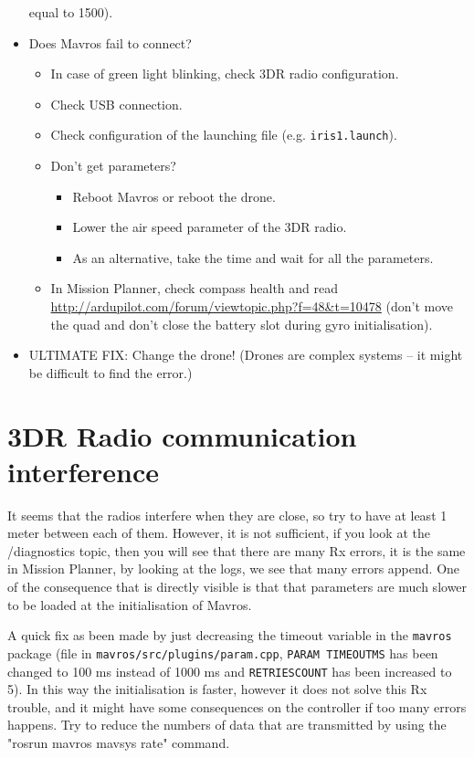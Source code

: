 \documentclass[titlepage,11pt,a4paper]{article}
\begin{document}
\begin{appendices}
\begin{itemize}
    equal to 1500).
  \item Does Mavros fail to connect?
    \begin{itemize}
      \item In case of green light blinking, check 3DR radio
        configuration.
      \item Check USB connection.
      \item Check configuration of the launching file (e.g. \texttt{iris1.launch}).
      \item Don't get parameters?
        \begin{itemize}
          \item Reboot Mavros or reboot the drone.
          \item Lower the air speed parameter of the 3DR radio.
          \item As an alternative, take the time and wait for all the
            parameters.
        \end{itemize}
      \item In Mission Planner, check compass health and read
        \url{http://ardupilot.com/forum/viewtopic.php?f=48&t=10478}
        (don't move the quad and don't close the battery slot during gyro
        initialisation).
    \end{itemize}
  \item ULTIMATE FIX: Change the drone! (Drones are complex systems -- it
    might be difficult to find the error.)
\end{itemize}
    
\section{3DR Radio communication interference}
It seems that the radios interfere when they are close, so try to have
at least 1 meter between each of them.  However, it is not sufficient,
if you look at the /diagnostics topic, then you will see that there
are many Rx errors, it is the same in Mission Planner, by looking at
the logs, we see that many errors append. One of the consequence that
is directly visible is that that parameters are much slower to be
loaded at the initialisation of Mavros.

A quick fix as been made by just decreasing the timeout variable in
the \texttt{mavros} package (file in
\texttt{mavros/src/plugins/param.cpp}, \texttt{PARAM\textunderscore
  TIMEOUT\textunderscore MS} has been changed to 100 ms instead of
1000 ms and \texttt{RETRIES\textunderscore COUNT} has been increased
to 5). In this way the initialisation is faster, however it does not
solve this Rx trouble, and it might have some consequences on the
controller if too many errors happens.  Try to reduce the numbers of
data that are transmitted by using the "rosrun mavros mavsys rate"
command.


\end{appendices}
\end{document}
